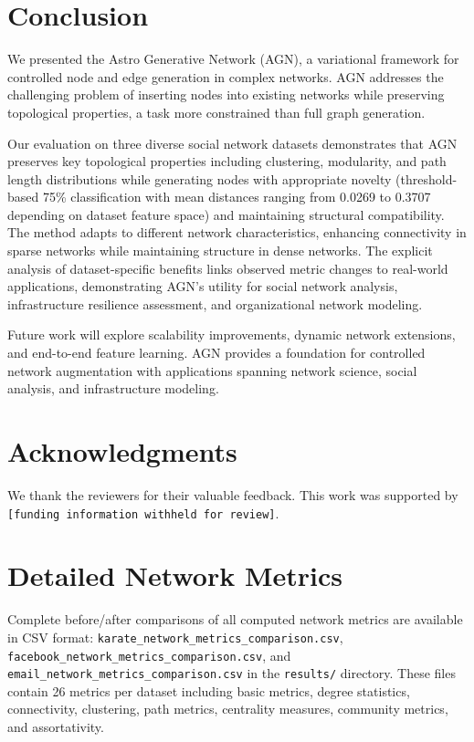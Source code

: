 \documentclass[12pt]{article}
\begin{document}
\section{Conclusion}

We presented the Astro Generative Network (AGN), a variational framework for controlled node and edge generation in complex networks. AGN addresses the challenging problem of inserting nodes into existing networks while preserving topological properties, a task more constrained than full graph generation.

Our evaluation on three diverse social network datasets demonstrates that AGN preserves key topological properties including clustering, modularity, and path length distributions while generating nodes with appropriate novelty (threshold-based 75\% classification with mean distances ranging from 0.0269 to 0.3707 depending on dataset feature space) and maintaining structural compatibility. The method adapts to different network characteristics, enhancing connectivity in sparse networks while maintaining structure in dense networks. The explicit analysis of dataset-specific benefits links observed metric changes to real-world applications, demonstrating AGN's utility for social network analysis, infrastructure resilience assessment, and organizational network modeling.

Future work will explore scalability improvements, dynamic network extensions, and end-to-end feature learning. AGN provides a foundation for controlled network augmentation with applications spanning network science, social analysis, and infrastructure modeling.

\section*{Acknowledgments}

We thank the reviewers for their valuable feedback. This work was supported by \texttt{[funding information withheld for review]}.

\appendix

\section{Detailed Network Metrics}

Complete before/after comparisons of all computed network metrics are available in CSV format: \texttt{karate\_network\_metrics\_comparison.csv}, \texttt{facebook\_network\_metrics\_comparison.csv}, and \texttt{email\_network\_metrics\_comparison.csv} in the \texttt{results/} directory. These files contain 26 metrics per dataset including basic metrics, degree statistics, connectivity, clustering, path metrics, centrality measures, community metrics, and assortativity.
\end{document}
